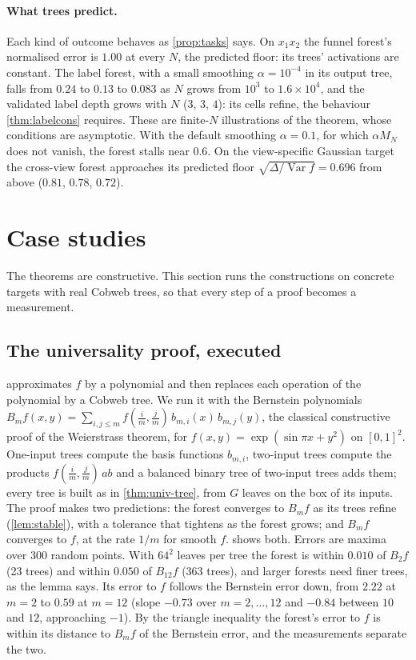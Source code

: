 \documentclass[11pt]{article}
\theoremstyle{definition}
\theoremstyle{remark}
\newcommand{\Var}{\operatorname{Var}}
\begin{document}
\paragraph{What trees predict.}
Each kind of outcome behaves as \cref{prop:tasks} says.  On $x_1x_2$ the funnel forest's
normalised error is $1.00$ at every $N$, the predicted floor: its trees' activations are
constant.  The label forest, with a small smoothing $\alpha=10^{-4}$ in its output tree, falls from
$0.24$ to $0.13$ to $0.083$ as $N$ grows from $10^3$ to $1.6\times10^4$, and the validated label
depth grows with $N$ ($3$, $3$, $4$): its cells refine, the behaviour \cref{thm:labelcons}
requires.  These are finite-$N$ illustrations of the theorem, whose conditions are
asymptotic.  With the default smoothing $\alpha=0.1$, for which $\alpha M_N$ does not vanish,
the forest stalls near $0.6$.  On the
view-specific Gaussian target the cross-view forest approaches its predicted floor
$\sqrt{\Delta/\Var f}=0.696$ from above ($0.81$, $0.78$, $0.72$).

\section{Case studies}\label{sec:cases}

The theorems are constructive.  This section runs the constructions on concrete targets with
real Cobweb trees, so that every step of a proof becomes a measurement.

\subsection{The universality proof, executed}

 approximates $f$ by a polynomial and then replaces each operation of
the polynomial by a Cobweb tree.  We run it with the Bernstein polynomials
$B_mf(x,y)=\sum_{i,j\le m}f(\tfrac im,\tfrac jm)\,b_{m,i}(x)\,b_{m,j}(y)$, the classical constructive
proof of the Weierstrass theorem, for $f(x,y)=\exp(\sin\pi x+y^2)$ on $[0,1]^2$.  One-input trees
compute the basis functions $b_{m,i}$, two-input trees compute the products
$f(\tfrac im,\tfrac jm)\,ab$ and a balanced binary tree of two-input trees adds them; every tree is
built as in \cref{thm:univ-tree}, from $G$ leaves on the box of its inputs.  The proof makes
two predictions: the forest converges to $B_mf$ as its trees refine (\cref{lem:stable}), with
a tolerance that tightens as the forest grows; and $B_mf$ converges to $f$, at the rate $1/m$
for smooth $f$.   shows both.  Errors are maxima over 300 random points.  With $64^2$ leaves per tree
the forest is within $0.010$ of $B_2f$ (23 trees) and within $0.050$ of $B_{12}f$ (363 trees), and
larger forests need finer trees, as the lemma says.  Its error to $f$ follows the Bernstein
error down, from $2.22$ at $m=2$ to $0.59$ at $m=12$ (slope $-0.73$ over $m=2,\dots,12$ and $-0.84$
between $10$ and $12$, approaching $-1$).  By the triangle inequality the forest's error to $f$
is within its distance to $B_mf$ of the Bernstein error, and the measurements separate the
two.
\end{document}
